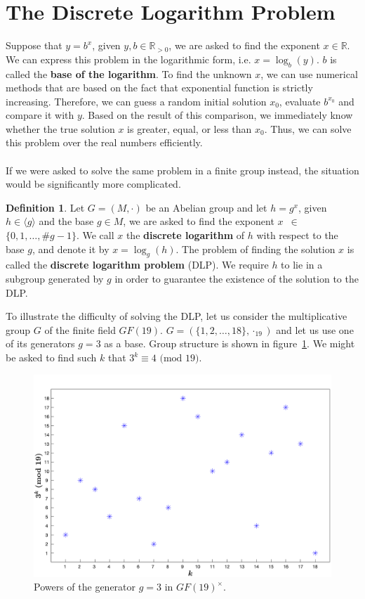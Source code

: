 \documentclass[thesis=M,english]{FITthesis}[2012/10/20]
\theoremstyle{remark}
\theoremstyle{definition}
\newtheorem{DF}{Definition}[section]
\begin{document}
\section{The Discrete Logarithm Problem}
Suppose that $y = b^x$, given $y,b \in \mathbb{R}_{> 0}$, we are asked to find the exponent $x \in \mathbb{R}$. We can express this problem in the logarithmic form, i.e. $x = \log_b(y)$. $b$ is called the \textbf{base of the logarithm}. To find the unknown $x$, we can use numerical methods that are based on the fact that exponential function is strictly increasing. Therefore, we can guess a random initial solution $x_0$, evaluate $b^{x_0}$ and compare it with $y$. Based on the result of this comparison, we immediately know whether the true solution $x$ is greater, equal, or less than $x_0$. Thus, we can solve this problem over the real numbers efficiently.
\\
\\
\noindent If we were asked to solve the same problem in a finite group instead, the situation would be significantly more complicated.
\begin{DF}
Let $G = (M, \cdot)$ be an Abelian group and let $h = g^x$, given $h \in \langle g \rangle$ and the base $g \in M$, we are asked to find the exponent $x$~$\in$~$\{0,1, \ldots, \#g - 1\}.$ We call $x$ the \textbf{discrete logarithm} of $h$ with respect to the base $g$, and denote it by $x= \log_g(h)$. The problem of finding the solution $x$ is called the \textbf{discrete logarithm problem} (DLP). We require $h$ to lie in a subgroup generated by $g$ in order to guarantee the existence of the solution to the DLP. 
\end{DF}
\noindent To illustrate the difficulty of solving the DLP, let us consider the multiplicative group $G$ of the finite field $GF(19).$ $G = (\{1,2,\ldots,18\}, \cdot_{19})$ and let us use one of its generators $g=3$ as a base. Group structure is shown in figure~\ref{fig2}. We might be asked to find such $k$ that $3^k \equiv 4 \text{ (mod 19)}$. 
 \begin{figure}[h]
 	\includegraphics[width=1\textwidth]{graph3in19.png}
 	\caption[Example of the group structure of $GF(19)^\times$]{Powers of the generator $g = 3$ in $GF(19)^\times$.}
 	\label{fig2}
 \end{figure}
\end{document}
